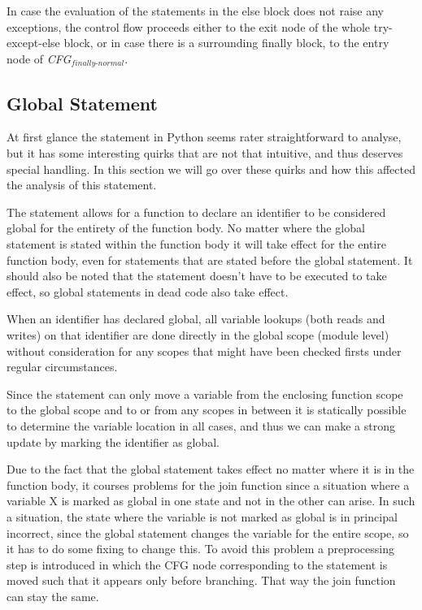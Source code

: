 In case the evaluation of the statements in the else block does not raise any exceptions, 
the control flow proceeds either to the exit node of the whole try-except-else block, or in case there is a surrounding finally block, 
to the entry node of \textit{CFG$_{\textit{finally-normal}}$}.



\subsection{Global Statement}
At first glance the  statement in Python seems rater straightforward to analyse, but it has some interesting quirks that are not that intuitive, and thus deserves special handling. In this section we will go over these quirks and how this affected the analysis of this statement.

The statement allows for a function to declare an identifier to be considered global for the entirety of the function body. No matter where the global statement is stated within the function body it will take effect for the entire function body, even for statements that are stated before the global statement. It should also be noted that the statement doesn't have to be executed to take effect, so global statements in dead code also take effect.

When an identifier has declared global, all variable lookups (both reads and writes) on that identifier are done directly in the global scope (module level) without consideration for any scopes that might have been checked firsts under regular circumstances.

Since the  statement can only move a variable from the enclosing function scope to the global scope and to or from any scopes in between it is statically possible to determine the variable location in all cases, and thus we can make a strong update by marking the identifier as global. 

Due to the fact that the global statement takes effect no matter where it is in the function body, it courses problems for the join function since a situation where a variable X is marked as global in one state and not in the other can arise. In such a situation, the state where the variable is not marked as global is in principal incorrect, since the global statement changes the variable for the entire scope, so it has to do some fixing to change this. To avoid this problem a preprocessing step is introduced in which the CFG node corresponding to the  statement is moved such that it appears only before branching. That way the join function can stay the same.



